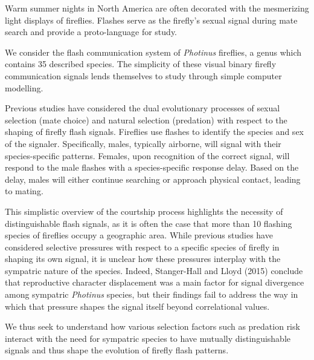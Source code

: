 

Warm summer nights in North America are often decorated with the mesmerizing light displays of fireflies. 
Flashes serve as the firefly's sexual signal during mate search and provide a proto-language for study. 


We consider the flash communication system of {\it Photinus} fireflies, a genus which contains 35 described species.
The simplicity of these visual binary firefly communication signals lends themselves to study through simple computer modelling.

Previous studies have considered the dual evolutionary processes of sexual selection (mate choice) and natural selection (predation) with respect to the shaping of firefly flash signals. 
Fireflies use flashes to identify the species and sex of the signaler. 
Specifically, males, typically airborne, will signal with their species-specific patterns. 
Females, upon recognition of the correct signal, will respond to the male flashes with a species-specific response delay.
Based on the delay, males will either continue searching or approach physical contact, leading to mating. 

This simplistic overview of the courtship process highlights the necessity of distinguishable flash signals, as it is often the case that more than 10 flashing species of fireflies occupy a geographic area. 
While previous studies have considered selective pressures with respect to a specific species of firefly in shaping its own signal, it is unclear how these pressures interplay with the sympatric nature of the species. 
Indeed, Stanger-Hall and Lloyd (2015) conclude that reproductive character displacement was a main factor for signal divergence among sympatric {\it Photinus} species, but their findings fail to address the way in which that pressure shapes the signal itself beyond correlational values. 

We thus seek to understand how various selection factors such as predation risk interact with the need for sympatric species to have mutually distinguishable signals and thus shape the evolution of firefly flash patterns. 

